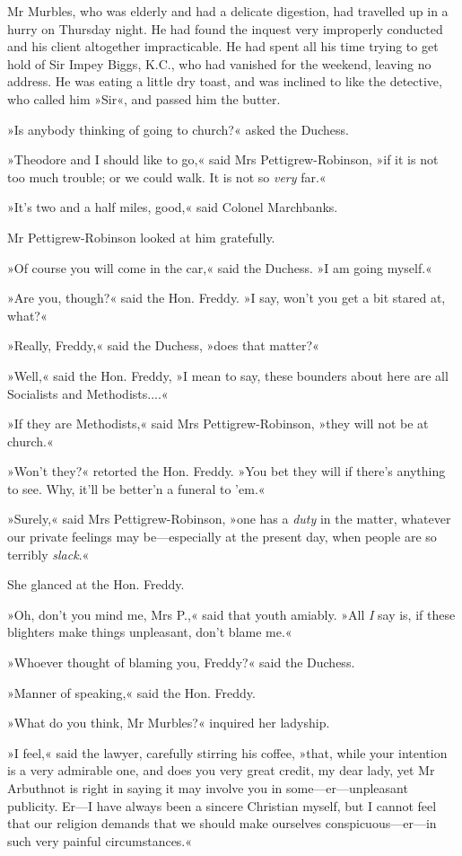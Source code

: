 Mr Murbles, who was elderly and had a delicate digestion, had travelled up in a hurry on Thursday night. He had found the inquest very improperly conducted and his client altogether impracticable. He had spent all his time trying to get hold of Sir Impey Biggs, K.C., who had vanished for the weekend, leaving no address. He was eating a little dry toast, and was inclined to like the detective, who called him »Sir«, and passed him the butter.

»Is anybody thinking of going to church?« asked the Duchess.

»Theodore and I should like to go,« said Mrs Pettigrew-Robinson, »if it is not too much trouble; or we could walk. It is not so \textit{very} far.«

»It's two and a half miles, good,« said Colonel Marchbanks.

Mr Pettigrew-Robinson looked at him gratefully.

»Of course you will come in the car,« said the Duchess. »I am going myself.«

»Are you, though?« said the Hon. Freddy. »I say, won't you get a bit stared at, what?«

»Really, Freddy,« said the Duchess, »does that matter?«

»Well,« said the Hon. Freddy, »I mean to say, these bounders about here are all Socialists and Methodists....«

»If they are Methodists,« said Mrs Pettigrew-Robinson, »they will not be at church.«

»Won't they?« retorted the Hon. Freddy. »You bet they will if there's anything to see. Why, it'll be better'n a funeral to 'em.«

»Surely,« said Mrs Pettigrew-Robinson, »one has a \textit{duty} in the matter, whatever our private feelings may be\allowbreak---\allowbreak especially at the present day, when people are so terribly \textit{slack}.«

She glanced at the Hon. Freddy.

»Oh, don't you mind me, Mrs P.,« said that youth amiably. »All \textit{I} say is, if these blighters make things unpleasant, don't blame me.«

»Whoever thought of blaming you, Freddy?« said the Duchess.

»Manner of speaking,« said the Hon. Freddy.

»What do you think, Mr Murbles?« inquired her ladyship.

»I feel,« said the lawyer, carefully stirring his coffee, »that, while your intention is a very admirable one, and does you very great credit, my dear lady, yet Mr Arbuthnot is right in saying it may involve you in some\allowbreak---\allowbreak er---unpleasant publicity. Er\allowbreak---\allowbreak I have always been a sincere Christian myself, but I cannot feel that our religion demands that we should make ourselves conspicuous\allowbreak---\allowbreak er---in such very painful circumstances.«

